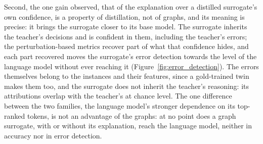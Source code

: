Second, the one gain observed, that of the explanation over a distilled surrogate's own confidence, is a property of distillation, not of graphs, and its meaning is precise: it brings the surrogate closer to its base model. The surrogate inherits the teacher's decisions and is confident in them, including the teacher's errors; the perturbation-based metrics recover part of what that confidence hides, and each part recovered moves the surrogate's error detection towards the level of the language model without ever reaching it (Figure~\ref{fig:error_detection}). The errors themselves belong to the instances and their features, since a gold-trained twin makes them too, and the surrogate does not inherit the teacher's reasoning: its attributions overlap with the teacher's at chance level. The one difference between the two families, the language model's stronger dependence on its top-ranked tokens, is not an advantage of the graphs: at no point does a graph surrogate, with or without its explanation, reach the language model, neither in accuracy nor in error detection.
